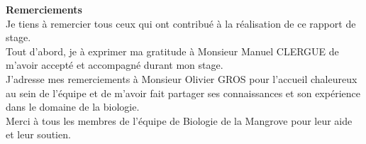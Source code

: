 \vspace*{\fill}
    \begin{center}
        \textbf{\large{Remerciements}} \\[2cm]
        Je tiens à remercier tous ceux qui ont contribué à la réalisation de ce rapport de stage. \\[0.5cm]

        Tout d'abord, je à exprimer ma gratitude à Monsieur Manuel CLERGUE de m'avoir accepté et accompagné durant mon stage. \\[0.5cm]

        J'adresse mes remerciements à Monsieur Olivier GROS pour l'accueil chaleureux au sein de l'équipe et de m'avoir fait partager ses connaissances et son expérience dans le domaine de la biologie. \\[0.5cm]

        Merci à tous les membres de l'équipe de Biologie de la Mangrove pour leur aide et leur soutien. \\[0.5cm]
    \end{center}
\vspace*{\fill}